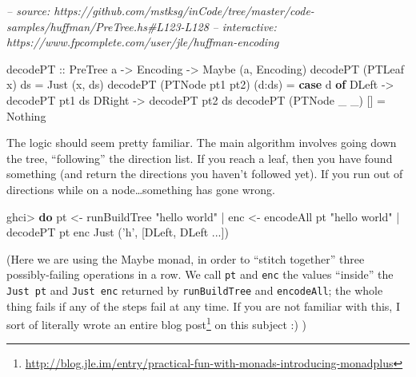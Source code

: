 \documentclass[]{article}
\newenvironment{Shaded}{}{}
\newcommand{\CharTok}[1]{\textcolor[rgb]{0.25,0.44,0.63}{#1}}
\newcommand{\CommentTok}[1]{\textcolor[rgb]{0.38,0.63,0.69}{\textit{#1}}}
\newcommand{\DataTypeTok}[1]{\textcolor[rgb]{0.56,0.13,0.00}{#1}}
\newcommand{\FunctionTok}[1]{\textcolor[rgb]{0.02,0.16,0.49}{#1}}
\newcommand{\KeywordTok}[1]{\textcolor[rgb]{0.00,0.44,0.13}{\textbf{#1}}}
\newcommand{\NormalTok}[1]{#1}
\newcommand{\OtherTok}[1]{\textcolor[rgb]{0.00,0.44,0.13}{#1}}
\newcommand{\StringTok}[1]{\textcolor[rgb]{0.25,0.44,0.63}{#1}}
\renewcommand{\href}[2]{#2\footnote{\url{#1}}}
\begin{document}
\begin{Shaded}
\begin{Highlighting}[]
\CommentTok{-- source: https://github.com/mstksg/inCode/tree/master/code-samples/huffman/PreTree.hs#L123-L128}
\CommentTok{-- interactive: https://www.fpcomplete.com/user/jle/huffman-encoding}

\OtherTok{decodePT ::} \DataTypeTok{PreTree}\NormalTok{ a }\OtherTok{->} \DataTypeTok{Encoding} \OtherTok{->} \DataTypeTok{Maybe}\NormalTok{ (a, }\DataTypeTok{Encoding}\NormalTok{)}
\NormalTok{decodePT (}\DataTypeTok{PTLeaf}\NormalTok{ x)       ds     }\FunctionTok{=} \DataTypeTok{Just}\NormalTok{ (x, ds)}
\NormalTok{decodePT (}\DataTypeTok{PTNode}\NormalTok{ pt1 pt2) (d}\FunctionTok{:}\NormalTok{ds) }\FunctionTok{=} \KeywordTok{case}\NormalTok{ d }\KeywordTok{of}
                                     \DataTypeTok{DLeft}  \OtherTok{->}\NormalTok{ decodePT pt1 ds}
                                     \DataTypeTok{DRight} \OtherTok{->}\NormalTok{ decodePT pt2 ds}
\NormalTok{decodePT (}\DataTypeTok{PTNode}\NormalTok{ _ _)     []     }\FunctionTok{=} \DataTypeTok{Nothing}
\end{Highlighting}
\end{Shaded}

The logic should seem pretty familiar. The main algorithm involves going down
the tree, ``following'' the direction list. If you reach a leaf, then you have
found something (and return the directions you haven't followed yet). If you run
out of directions while on a node\ldots{}something has gone wrong.

\begin{Shaded}
\begin{Highlighting}[]
\NormalTok{ghci}\FunctionTok{>} \KeywordTok{do}\NormalTok{  pt  }\OtherTok{<-}\NormalTok{ runBuildTree }\StringTok{"hello world"}
    \FunctionTok{|}\NormalTok{     enc }\OtherTok{<-}\NormalTok{ encodeAll pt }\StringTok{"hello world"}
    \FunctionTok{|}\NormalTok{     decodePT pt enc}
\DataTypeTok{Just}\NormalTok{ (}\CharTok{'h'}\NormalTok{, [}\DataTypeTok{DLeft}\NormalTok{, }\DataTypeTok{DLeft} \FunctionTok{...}\NormalTok{])}
\end{Highlighting}
\end{Shaded}

(Here we are using the Maybe monad, in order to ``stitch together'' three
possibly-failing operations in a row. We call \texttt{pt} and \texttt{enc} the
values ``inside'' the \texttt{Just\ pt} and \texttt{Just\ enc} returned by
\texttt{runBuildTree} and \texttt{encodeAll}; the whole thing fails if any of
the steps fail at any time. If you are not familiar with this,
\href{http://blog.jle.im/entry/practical-fun-with-monads-introducing-monadplus}{I
sort of literally wrote an entire blog post} on this subject :) )
\end{document}
